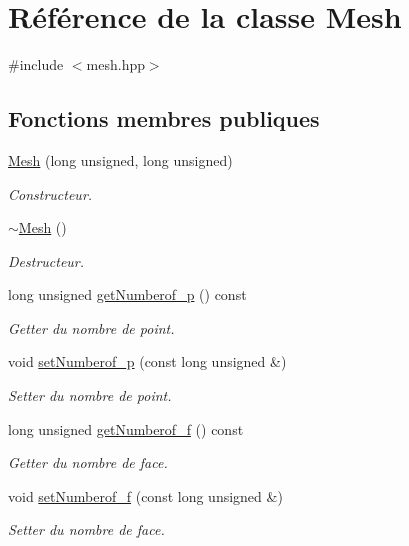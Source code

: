 \hypertarget{class_mesh}{\section{Référence de la classe Mesh}
\label{class_mesh}
}


{\ttfamily \#include $<$mesh.\-hpp$>$}

\subsection*{Fonctions membres publiques}
\begin{DoxyCompactItemize}
\item 
\hyperlink{class_mesh_ad747dad3a49288d7d452b804be0f6fb5}{Mesh} (long unsigned, long unsigned)
\begin{DoxyCompactList}\small\item\em Constructeur. \end{DoxyCompactList}\item 
\hyperlink{class_mesh_a5efe4da1a4c0971cfb037bd70304c303}{$\sim$\-Mesh} ()
\begin{DoxyCompactList}\small\item\em Destructeur. \end{DoxyCompactList}\item 
long unsigned \hyperlink{class_mesh_a60382f3b0a69d639003c5ea28c352459}{get\-Numberof\-\_\-p} () const 
\begin{DoxyCompactList}\small\item\em Getter du nombre de point. \end{DoxyCompactList}\item 
void \hyperlink{class_mesh_a9be8784f047b1364f14f2a21726fd082}{set\-Numberof\-\_\-p} (const long unsigned \&)
\begin{DoxyCompactList}\small\item\em Setter du nombre de point. \end{DoxyCompactList}\item 
long unsigned \hyperlink{class_mesh_a6d39761b9be2bf04be1b242da25a8dce}{get\-Numberof\-\_\-f} () const 
\begin{DoxyCompactList}\small\item\em Getter du nombre de face. \end{DoxyCompactList}\item 
void \hyperlink{class_mesh_a33338e9861e4dbca2c2479ef5394f433}{set\-Numberof\-\_\-f} (const long unsigned \&)
\begin{DoxyCompactList}\small\item\em Setter du nombre de face. \end{DoxyCompactList}\end{DoxyCompactItemize}



